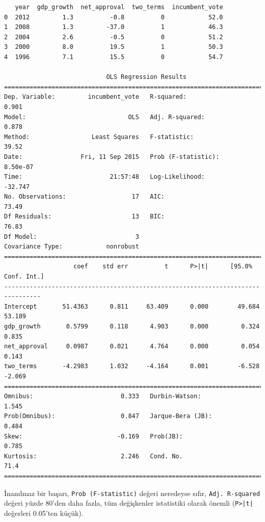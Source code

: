 \documentclass[12pt,fleqn]{article}\usepackage{../../common}
\begin{document}
\begin{verbatim}
   year  gdp_growth  net_approval  two_terms  incumbent_vote
0  2012         1.3          -0.8          0            52.0
1  2008         1.3         -37.0          1            46.3
2  2004         2.6          -0.5          0            51.2
3  2000         8.0          19.5          1            50.3
4  1996         7.1          15.5          0            54.7 

                            OLS Regression Results                            
==============================================================================
Dep. Variable:         incumbent_vote   R-squared:                       0.901
Model:                            OLS   Adj. R-squared:                  0.878
Method:                 Least Squares   F-statistic:                     39.52
Date:                Fri, 11 Sep 2015   Prob (F-statistic):           8.50e-07
Time:                        21:57:48   Log-Likelihood:                -32.747
No. Observations:                  17   AIC:                             73.49
Df Residuals:                      13   BIC:                             76.83
Df Model:                           3                                         
Covariance Type:            nonrobust                                         
================================================================================
                   coef    std err          t      P>|t|      [95.0% Conf. Int.]
--------------------------------------------------------------------------------
Intercept       51.4363      0.811     63.409      0.000        49.684    53.189
gdp_growth       0.5799      0.118      4.903      0.000         0.324     0.835
net_approval     0.0987      0.021      4.764      0.000         0.054     0.143
two_terms       -4.2983      1.032     -4.164      0.001        -6.528    -2.069
==============================================================================
Omnibus:                        0.333   Durbin-Watson:                   1.545
Prob(Omnibus):                  0.847   Jarque-Bera (JB):                0.484
Skew:                          -0.169   Prob(JB):                        0.785
Kurtosis:                       2.246   Cond. No.                         71.4
==============================================================================
\end{verbatim}

İnanılmaz bir başarı, \verb!Prob (F-statistic)! değeri neredeyse sıfır,
\verb!Adj. R-squared! değeri yüzde 80'den daha fazla, tüm değişkenler
istatistiki olarak önemli (\verb!P>|t|! değerleri 0.05'ten küçük).
\end{document}

